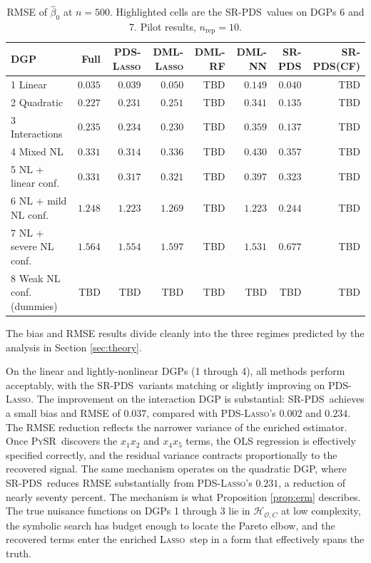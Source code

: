 \documentclass[11pt, a4paper]{article}
\theoremstyle{plain}
\theoremstyle{definition}
\theoremstyle{remark}
\newcommand{\hl}[1]{\cellcolor{highlight}#1}
\newcommand{\lasso}{\textsc{Lasso}}
\newcommand{\pds}{\textsc{PDS}}
\newcommand{\dml}{\textsc{DML}}
\newcommand{\pysr}{\textsc{PySR}}
\newcommand{\epds}{\textsc{SR-PDS}}
\newcommand{\betahat}{\hat{\beta}_0}
\newcommand{\Hcal}{\mathcal{H}_{\mathcal{O}, C}}
\begin{document}
\begin{table}[H]
\centering
\caption{RMSE of $\betahat$ at $n=500$. Highlighted cells are
the \epds\ values on DGPs 6 and 7. Pilot results,
$n_{\text{rep}} = 10$.}
\label{tab:rmse}
\small
\setlength{\tabcolsep}{4pt}
\begin{tabular}{lrrrrrrr}
    \toprule
    DGP
        & Full
        & \pds-\lasso
        & \dml-\lasso
        & \dml-RF
        & \dml-NN
        & \epds
        & \epds (CF) \\
    \midrule
    1 Linear
        & $0.035$ & $0.039$ & $0.050$ & {\small TBD} & $0.149$ & $0.040$ & {\small TBD} \\
    2 Quadratic
        & $0.227$ & $0.231$ & $0.251$ & {\small TBD} & $0.341$ & $0.135$ & {\small TBD} \\
    3 Interactions
        & $0.235$ & $0.234$ & $0.230$ & {\small TBD} & $0.359$ & $0.137$ & {\small TBD} \\
    4 Mixed NL
        & $0.331$ & $0.314$ & $0.336$ & {\small TBD} & $0.430$ & $0.357$ & {\small TBD} \\
    5 NL + linear conf.
        & $0.331$ & $0.317$ & $0.321$ & {\small TBD} & $0.397$ & $0.323$ & {\small TBD} \\
    6 NL + mild NL conf.
        & $1.248$ & $1.223$ & $1.269$ & {\small TBD} & $1.223$ & \hl{$0.244$} & {\small TBD} \\
    7 NL + severe NL conf.
        & $1.564$ & $1.554$ & $1.597$ & {\small TBD} & $1.531$ & \hl{$0.677$} & {\small TBD} \\
        8 Weak NL conf. (dummies)
        & {\small TBD} & {\small TBD} & {\small TBD} & {\small TBD} & {\small TBD} & {\small TBD} & {\small TBD} \\
    \bottomrule
\end{tabular}
\end{table}

The bias and RMSE results divide cleanly into the three regimes
predicted by the analysis in Section \ref{sec:theory}.

On the linear and lightly-nonlinear DGPs (1 through 4), all
methods perform acceptably, with the \epds\ variants matching or
slightly improving on \pds-\lasso. The improvement on the
interaction DGP is substantial: \epds\ achieves a small bias
and RMSE of $0.037$, compared with \pds-\lasso's $0.002$ and
$0.234$. The RMSE reduction reflects the narrower variance of the
enriched estimator. Once \pysr\ discovers the $x_1 x_2$ and
$x_4 x_5$ terms, the OLS regression is effectively specified
correctly, and the residual variance contracts proportionally to
the recovered signal. The same mechanism operates on the
quadratic DGP, where \epds\ reduces RMSE substantially from
\pds-\lasso's $0.231$, a reduction of nearly seventy percent.
The mechanism is what Proposition \ref{prop:erm} describes.
The true nuisance functions on DGPs 1 through 3 lie in $\Hcal$
at low complexity, the symbolic search has budget enough to
locate the Pareto elbow, and the recovered terms enter the
enriched \lasso\ step in a form that effectively spans the
truth.
\end{document}
